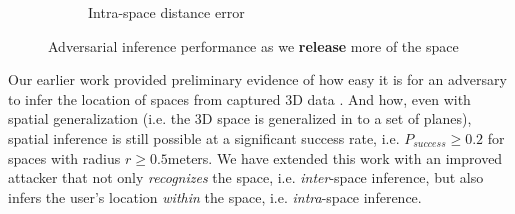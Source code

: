 \begin{figure}[t]
\begin{subfigure}{0.37\columnwidth}
		\vspace{-5mm}
        \caption{\small Intra-space distance error}
		\label{fig:successive-intraspace}
	\end{subfigure}
	\vspace{-3mm}
    \caption{Adversarial inference performance as we \textbf{release} more of the space}
	\label{fig:successive-performance}
	\vspace{-3mm}
\end{figure}

Our earlier work provided preliminary evidence of how easy it is for an adversary to infer the location of spaces from captured 3D data \cite{deguzman2019firstlook}. And how, even with spatial generalization (i.e. the 3D space is generalized in to a set of planes), spatial inference is still possible at a significant success rate, i.e. $P_{success}\geq0.2$ for spaces with radius $r\geq 0.5$meters. We have extended this work with an improved attacker that not only \textit{recognizes} the space, i.e. \textit{inter}-space inference, but also infers the user's location \textit{within} the space, i.e. \textit{intra}-space inference. %


